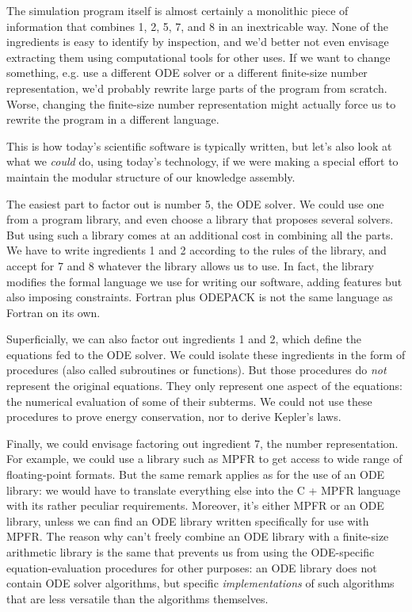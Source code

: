 The simulation program itself is almost certainly a monolithic piece of information that combines 1, 2, 5, 7, and 8 in an inextricable way. None of the ingredients is easy to identify by inspection, and we'd better not even envisage extracting them using computational tools for other uses. If we want to change something, e.g. use a different ODE solver or a different finite-size number representation, we'd probably rewrite large parts of the program from scratch. Worse, changing the finite-size number representation might actually force us to rewrite the program in a different language.

This is how today's scientific software is typically written, but let's also look at what we \textit{could} do, using today's technology, if we were making a special effort to maintain the modular structure of our knowledge assembly.

The easiest part to factor out is number 5, the ODE solver. We could use one from a program library, and even choose a library that proposes several solvers. But using such a library comes at an additional cost in combining all the parts. We have to write ingredients 1 and 2 according to the rules of the library, and accept for 7 and 8 whatever the library allows us to use. In fact, the library modifies the formal language we use for writing our software, adding features but also imposing constraints. Fortran plus ODEPACK is not the same language as Fortran on its own.

Superficially, we can also factor out ingredients 1 and 2, which define the equations fed to the ODE solver. We could isolate these ingredients in the form of procedures (also called subroutines or functions). But those procedures do \textit{not} represent the original equations. They only represent one aspect of the equations: the numerical evaluation of some of their subterms. We could not use these procedures to prove energy conservation, nor to derive Kepler's laws.

Finally, we could envisage factoring out ingredient 7, the number representation. For example, we could use a library such as MPFR \cite{fousse_mpfr_2007} to get access to wide range of floating-point formats. But the same remark applies as for the use of an ODE library: we would have to translate everything else into the C + MPFR language with its rather peculiar requirements. Moreover, it's either MPFR or an ODE library, unless we can find an ODE library written specifically for use with MPFR. The reason why can't freely combine an ODE library with a finite-size arithmetic library is the same that prevents us from using the ODE-specific equation-evaluation procedures for other purposes: an ODE library does not contain ODE solver algorithms, but specific \textit{implementations} of such algorithms that are less versatile than the algorithms themselves.

